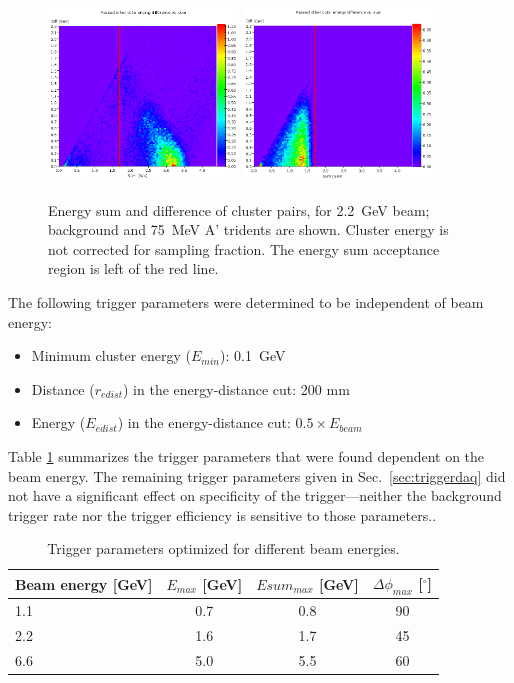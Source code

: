 \begin{figure}[ht]
	\includegraphics[width=0.45\textwidth]{performance/trigger/ediff_22}
	\includegraphics[width=0.45\textwidth]{performance/trigger/ediff_22_075mev}
	\caption{\small{Energy sum and difference of cluster pairs, for 2.2~GeV beam; background and 75~MeV A' tridents are shown. Cluster energy is not corrected for sampling fraction. The energy sum acceptance region is left of the red line.}}
	\label{fig:ediff}
\end{figure}

The following trigger parameters were determined to be independent of beam energy:
\begin{itemize}
	\item Minimum cluster energy ($E_{min}$): 0.1~GeV
	\item Distance ($r_{edist}$) in the energy-distance cut: 200 mm
	\item Energy ($E_{edist}$) in the energy-distance cut: $0.5\times E_{beam}$
\end{itemize}

Table \ref{tab:trigcuts} summarizes the trigger parameters that were found dependent on the beam energy. 
The remaining trigger parameters given in Sec.~\ref{sec:triggerdaq} did not have a significant 
effect on specificity of the trigger---neither the background trigger rate nor the trigger efficiency is sensitive to those parameters..

\begin{table}
	\begin{tabular}{|l|c|c|c|}
		\hline
		Beam energy [GeV] & $E_{max}$ [GeV] & $Esum_{max}$ [GeV] & $\Delta\phi_{max}$ [$^\circ$] \\
		\hline
		1.1	&	0.7	&	0.8	&	90\\
		2.2	&	1.6	&	1.7	&	45\\
		6.6	&	5.0	&	5.5	&	60\\
		\hline
	\end{tabular}
	\caption{ {\small Trigger parameters optimized for different beam energies.}
	\label{tab:trigcuts}}
\end{table}


